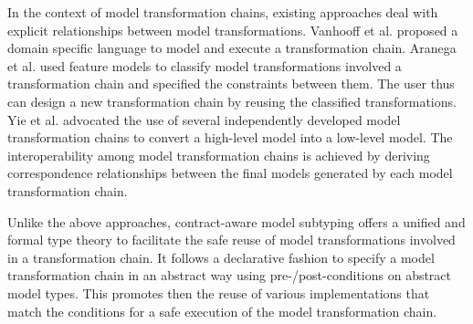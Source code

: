 In the context of model transformation chains, existing approaches deal with explicit relationships between model transformations. Vanhooff et al. \cite{vanhooff2007uniti} proposed a domain specific language to model and execute a transformation chain. 
%
Aranega et al. \cite{aranega2012using} used feature models to classify model transformations involved a transformation chain and specified the constraints between them. The user thus can design a new transformation chain by reusing the classified transformations.   
%
Yie et al. \cite{yie2012realizing} advocated the use of several independently developed model transformation chains to convert a high-level model into a low-level model. The interoperability among model transformation chains is achieved by deriving correspondence relationships between the final models generated by each model transformation chain. 

Unlike the above approaches, contract-aware model subtyping offers a unified and formal type theory to facilitate the safe reuse of model transformations involved in a transformation chain. It follows a declarative fashion to specify a model transformation chain in an abstract way using pre-/post-conditions on abstract model types. This promotes then the reuse of various implementations that match the conditions for a safe execution of the model transformation chain.


